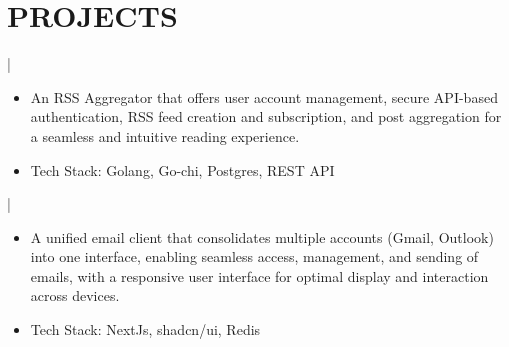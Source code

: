 \documentclass[]{resume}
\begin{document}
\section{PROJECTS}
 | \href{https://github.com/saswatax/rss-aggregator}{\faGithub}
\begin{itemize}
  \item An RSS Aggregator that offers user account management, secure API-based authentication, RSS feed creation and subscription, and post aggregation for a seamless and intuitive reading experience.
  \item Tech Stack: Golang, Go-chi, Postgres, REST API
\end{itemize}
 | \href{https://github.com/saswatax/email-client}{\faGithub}
\begin{itemize}
  \item A unified email client that consolidates multiple accounts (Gmail, Outlook) into one interface, enabling seamless access, management, and sending of emails, with a responsive user interface for optimal display and interaction across devices.
  \item Tech Stack: NextJs, shadcn/ui, Redis
\end{itemize}
\end{document}
